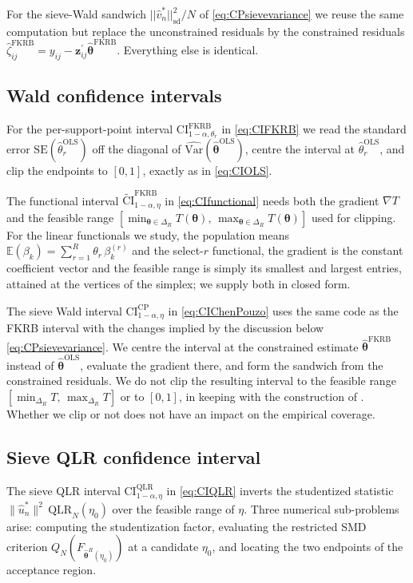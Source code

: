 For the sieve-Wald sandwich $||\hat{v}^*_n||^2_\mathrm{sd}/N$ of \cref{eq:CPsievevariance} we reuse the same computation but replace the unconstrained residuals by the constrained residuals $\hat{\zeta}^{\mathrm{FKRB}}_{ij} = y_{ij} - \bm{z}^\prime_{ij}\hat{\bm{\theta}}^{\mathrm{FKRB}}$.
Everything else is identical.

\subsection{Wald confidence intervals}
\label{sec:implementation:waldcis}
For the per-support-point interval $\mathrm{CI}^{\mathrm{FKRB}}_{1-\alpha,\theta_r}$ in \cref{eq:CIFKRB} we read the standard error $\mathrm{SE}(\hat{\theta}_r^{\mathrm{OLS}})$ off the diagonal of $\widehat{\mathrm{Var}}(\hat{\bm{\theta}}^{\mathrm{OLS}})$, centre the interval at $\hat{\theta}_r^{\mathrm{OLS}}$, and clip the endpoints to $[0,1]$, exactly as in \cref{eq:CIOLS}.

The functional interval $\widetilde{\mathrm{CI}}^{\mathrm{FKRB}}_{1-\alpha,\eta}$ in \cref{eq:CIfunctional} needs both the gradient $\nabla T$ and the feasible range $[\min_{\bm{\theta}\in\Delta_R}T(\bm{\theta}),\,\max_{\bm{\theta}\in\Delta_R}T(\bm{\theta})]$ used for clipping.
For the linear functionals we study, the population means $\mathbb{E}(\beta_k) = \sum_{r=1}^R \theta_r\,\beta_k^{(r)}$ and the select-$r$ functional, the gradient is the constant coefficient vector and the feasible range is simply its smallest and largest entries, attained at the vertices of the simplex; we supply both in closed form.

The sieve Wald interval $\mathrm{CI}^{\mathrm{CP}}_{1-\alpha, \eta}$ in \cref{eq:CIChenPouzo} uses the same code as the FKRB interval with the changes implied by the discussion below \cref{eq:CPsievevariance}.
We centre the interval at the constrained estimate $\hat{\bm{\theta}}^{\mathrm{FKRB}}$ instead of $\hat{\bm{\theta}}^{\mathrm{OLS}}$, evaluate the gradient there, and form the sandwich from the constrained residuals.
We do not clip the resulting interval to the feasible range $[\min_{\Delta_R}T,\,\max_{\Delta_R}T]$ or to $[0,1]$, in keeping with the construction of \citet{ChenPouzo2015}.
Whether we clip or not does not have an impact on the empirical coverage.

\subsection{Sieve QLR confidence interval}
\label{sec:implementation:qlr}
The sieve QLR interval $\mathrm{CI}^{\mathrm{QLR}}_{1-\alpha,\eta}$ in \cref{eq:CIQLR} inverts the studentized statistic $\|\hat{u}^*_n\|^2 \, \mathrm{QLR}_N(\eta_0)$ over the feasible range of $\eta$.
Three numerical sub-problems arise: computing the studentization factor, evaluating the restricted SMD criterion $Q_N(F_{\hat{\bm{\theta}}^R(\eta_0)})$ at a candidate $\eta_0$, and locating the two endpoints of the acceptance region.

